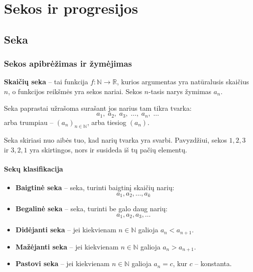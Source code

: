 \chapter{Sekos ir progresijos}

\section{Seka}

\subsection{Sekos apibrėžimas ir žymėjimas}

\begin{definition}
\textbf{Skaičių seka} – tai funkcija $f: \mathbb{N} \to \mathbb{R}$, kurios argumentas yra natūralusis skaičius $n$, o funkcijos reikšmės yra sekos nariai. Sekos $n$-tasis narys žymimas $a_n$.
\end{definition}

Seka paprastai užrašoma surašant jos narius tam tikra tvarka:
\[
a_1,\; a_2,\; a_3,\; \ldots,\; a_n,\; \ldots
\]
arba trumpiau – $(a_n)_{n \in \mathbb{N}}$, arba tiesiog $(a_n)$.

\begin{remark}
Seka skiriasi nuo aibės tuo, kad narių tvarka yra svarbi. Pavyzdžiui, sekos $1, 2, 3$ ir $3, 2, 1$ yra skirtingos, nors ir susideda iš tų pačių elementų.
\end{remark}

\subsubsection*{Sekų klasifikacija}

\begin{itemize}
    \item \textbf{Baigtinė seka} – seka, turinti baigtinį skaičių narių:
    \[
    a_1, a_2, \ldots, a_k
    \]
    \item \textbf{Begalinė seka} – seka, turinti be galo daug narių:
    \[
    a_1, a_2, a_3, \ldots
    \]
    \item \textbf{Didėjanti seka} – jei kiekvienam $n \in \mathbb{N}$ galioja $a_n < a_{n+1}$.
    \item \textbf{Mažėjanti seka} – jei kiekvienam $n \in \mathbb{N}$ galioja $a_n > a_{n+1}$.
    \item \textbf{Pastovi seka} – jei kiekvienam $n \in \mathbb{N}$ galioja $a_n = c$, kur $c$ – konstanta.
\end{itemize}

